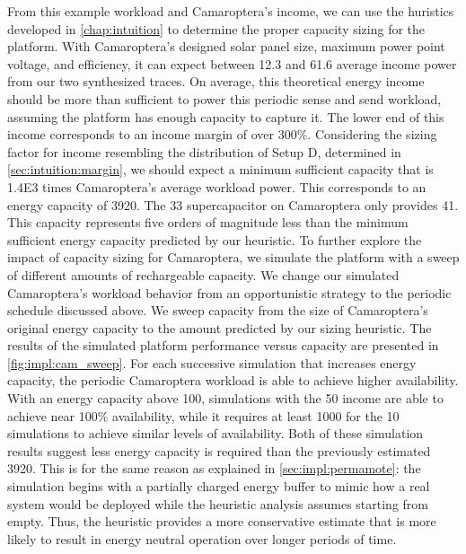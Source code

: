 From this example workload and Camaroptera's income, we can use the huristics developed in \cref{chap:intuition} to determine the proper capacity sizing for the platform.
With Camaroptera's designed solar panel size, maximum power point voltage, and efficiency, 
it can expect between 12.3 and 61.6\ssi{\milli\watt} average income power from our two synthesized traces.
On average, this theoretical energy income should be more than sufficient to power this periodic sense and send workload, assuming the platform has enough capacity to capture it.
The lower end of this income corresponds to an income margin of over 300\%. 
Considering the sizing factor for income resembling the distribution of Setup D, determined in \cref{sec:intuition:margin}, we should expect a minimum sufficient capacity that is \num{1.4E3} times Camaroptera's average workload power. 
This corresponds to an energy capacity of 3920\ssi{\milli\Wh}. 
The 33\ssi{\milli\farad} supercapacitor on Camaroptera only provides 41\ssi{\micro\Wh}. This capacity represents five orders of magnitude less than the minimum sufficient energy capacity predicted by our heuristic.
To further explore the impact of capacity sizing for Camaroptera, we simulate the platform with a sweep of different amounts of rechargeable capacity. 
We change our simulated Camaroptera's workload behavior from an opportunistic strategy to the periodic schedule discussed above.
We sweep capacity from the size of Camaroptera's original energy capacity to the amount predicted by our sizing heuristic.
The results of the simulated platform performance versus capacity are presented in \cref{fig:impl:cam_sweep}.
For each successive simulation that increases energy capacity, the periodic Camaroptera workload is able to achieve higher availability.
With an energy capacity above 100\ssi{\milli\watt\hour}, simulations with the 50\ssi[per-mode=symbol]{\milli\watt\per\centi\meter\squared} income are able to achieve near 100\% availability, while it requires at least 1000\ssi{\milli\watt\hour} for the 10\ssi[per-mode=symbol]{\milli\watt\per\centi\meter\squared} simulations to achieve similar levels of availability. 
Both of these simulation results suggest less energy capacity is required than the previously estimated 3920\ssi{\milli\Wh}.
This is for the same reason as explained in \cref{sec:impl:permamote}: the simulation begins with a partially charged energy buffer to mimic how a real system would be deployed while the heuristic analysis assumes starting from empty.
Thus, the heuristic provides a more conservative estimate that is more likely to result in energy neutral operation over longer periods of time.

